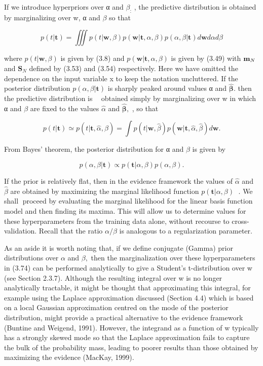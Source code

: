 \documentclass[
  10
]{article}
\begin{document}
If we introduce hyperpriors over α and \(\beta _ { : }\) , the
predictive distribution is obtained by marginalizing over w, α and
\(\beta\) so that

\[
p (t | \mathbf {t}) = \iiint p (t | \mathbf {w}, \beta) p (\mathbf {w} | \mathbf {t}, \alpha , \beta) p (\alpha , \beta | \mathbf {t}) d \mathbf {w} d \alpha d \beta\tag{3.74}
\]

where \(p ( t | \mathbf { w } , \beta )\) is given by (3.8) and
\(p ( \mathbf { w } | \mathbf { t } , \alpha , \beta )\) is given by
(3.49) with \({ \bf m } _ { N }\) and \(\mathbf { S } _ { N }\) defined
by (3.53) and (3.54) respectively. Here we have omitted the dependence
on the input variable x to keep the notation uncluttered. If the
posterior distribution \(p ( \alpha , \beta | \mathbf { t } )\) is
sharply peaked around values α and
\({ \widehat { \boldsymbol { \beta } } } .\) then the predictive
distribution is  obtained simply by marginalizing over w in which α and
\(\beta\) are fixed to the values \(\widehat { \alpha }\) and
\({ \widehat { \boldsymbol { \beta } } } ,\) , so that

\[
p (t | \mathbf {t}) \simeq p (t | \mathbf {t}, \widehat {\alpha}, \widehat {\beta}) = \int p (t | \mathbf {w}, \widehat {\beta}) p (\mathbf {w} | \mathbf {t}, \widehat {\alpha}, \widehat {\beta}) d \mathbf {w}.\tag{3.75}
\]

From Bayes' theorem, the posterior distribution for α and \(\beta\) is
given by

\[
p (\alpha , \beta | \mathbf {t}) \propto p (\mathbf {t} | \alpha , \beta) p (\alpha , \beta).\tag{3.76}
\]

If the prior is relatively flat, then in the evidence framework the
values of \(\widehat { \alpha }\) and \(\widehat { \beta }\) are
obtained by maximizing the marginal likelihood function
\(p ( \mathbf { t } | \alpha , \beta )\) . We shall proceed by
evaluating the marginal likelihood for the linear basis function model
and then finding its maxima. This will allow us to determine values for
these hyperparameters from the training data alone, without recourse to
cross-validation. Recall that the ratio \(\alpha / \beta\) is analogous
to a regularization parameter.

As an aside it is worth noting that, if we define conjugate (Gamma)
prior distributions over \(\alpha\) and \(\beta ,\) then the
marginalization over these hyperparameters in (3.74) can be performed
analytically to give a Student's t-distribution over w (see Section
2.3.7). Although the resulting integral over w is no longer analytically
tractable, it might be thought that approximating this integral, for
example using the Laplace approximation discussed (Section 4.4) which is
based on a local Gaussian approximation centred on the mode of the
posterior distribution, might provide a practical alternative to the
evidence framework (Buntine and Weigend, 1991). However, the integrand
as a function of w typically has a strongly skewed mode so that the
Laplace approximation fails to capture the bulk of the probability mass,
leading to poorer results than those obtained by maximizing the evidence
(MacKay, 1999).
\end{document}
